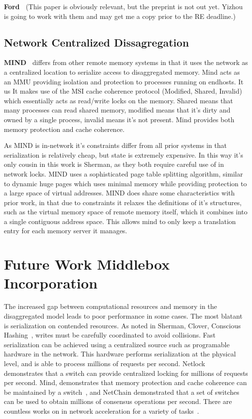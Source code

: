 \textbf{Ford~\cite{ford}}
(This paper is obviously relevant, but the preprint is not out yet. Yizhou is
going to work with them and may get me a copy prior to the RE deadline.)

\subsection{Network Centralized Dissagregation}

\textbf{MIND~\cite{mind}}
differs from other remote memory systems in that it uses the network as a
centralized location to serialize access to disaggregated memory. Mind acts as an
MMU providing isolation and protection to processes running on endhosts. It us  
It makes use of the MSI cache coherence protocol (Modified, Shared, Invalid)
which essentially acts as read/write locks on the memory. Shared means that many
processes can read shared memory, modified means that it's dirty and owned by a
single process, invalid means it's not present. Mind provides both memory
protection and cache coherence. 

As MIND is in-network it's constraints differ from all prior systems in that
serialization is relatively cheap, but state is extremely expensive. In this way
it's only cousin in this work is Sherman, as they both require careful use of in
network locks. MIND uses a sophisticated page table splitting algorithm, similar
to dynamic huge pages which uses minimal memory while providing protection to a
large space of virtual addresses. MIND does share some characteristics with
prior work, in that due to constraints it relaxes the definitions of it's
structures, such as the virtual memory space of remote memory itself, which it
combines into a single contiguous address space. This allows mind to only keep a
translation entry for each memory server it manages.


\section{Future Work Middlebox Incorporation}

The increased gap between computational resources and memory in the
disaggregated model leads to poor performance in some cases. The most blatant is
serialization on contended resources. As noted in Sherman, Clover, Conscious
Hashing~\cite{sherman,clover,one-sided-hash}, writes must be carefully
coordinated to avoid collisions. Fast serialization can be achieved using a
centralized source such as programable hardware in the network. This hardware
performs serialization at the physical level, and is able to process millions of
requests per second. Netlock~\cite{netlock} demonstrates that a switch can
provide centralized locking for millions of requests per second. Mind,
demonstrates that memory protection and cache coherence can be maintained by a
switch~\cite{mind}, and NetChain demonstrated that a set of switches can be used
to obtain millions of consensus operations per second. There are countless works
on in network acceleration for a variety of tasks~.

